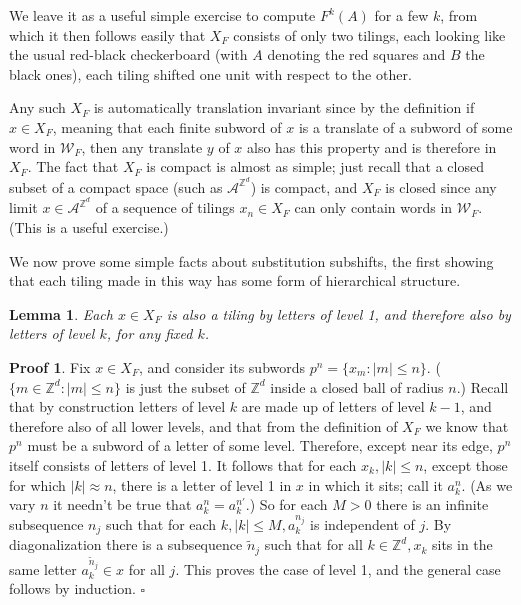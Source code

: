 \documentclass[reqno]{stml-l}
\theoremstyle{plain}
\newtheorem{lemma}[theorem]{Lemma}
\theoremstyle{definition}
\newtheorem*{proof*}{Proof}
\numberwithin{equation}{chapter}
\begin{document}
We leave it as a useful simple exercise to compute $F^{k}(A)$ for a few $k$, from which it then follows easily that $X_{F}$ consists of only two tilings, each looking like the usual red-black checkerboard (with $A$ denoting the red squares and $B$ the black ones), each tiling shifted one unit with respect to the other.

Any such $X_{F}$ is automatically translation invariant since by the definition if $x\in X_{F}$, meaning that each finite subword of $x$ is a translate of a subword of some word in $\mathcal{W}_{F}$, then any translate $y$ of $x$ also has this property and is therefore in $X_{F}$. The fact that $X_{F}$ is compact is almost as simple; just recall that a closed subset of a compact space (such as $\mathcal{A}^{\mathbb{Z}^{d}}$) is compact, and $X_{F}$ is closed since any limit $x\in \mathcal{A}^{\mathbb{Z}^{d}}$ of a sequence of tilings $x_{n}\in X_{F}$ can only contain words in $\mathcal{W}_{F}$. (This is a useful exercise.)

We now prove some simple facts about substitution subshifts, the first showing that each tiling made in this way has some form of hierarchical structure.

\begin{lemma}\label{ch01:lem1.4}
Each $x\in X_{F}$ is also a tiling by letters of level 1, and therefore also by letters of level $k$, for any fixed $k$.
\end{lemma}

\begin{proof*}
Fix $x\in X_{F}$, and consider its subwords $p^{n}=\{x_{m}:|m|\leq n\}$.
($\{m\in \mathbb{Z}^{d}:|m|\leq n\}$ is just the subset of $\mathbb{Z}^{d}$ inside a closed ball of radius $n$.) Recall that by construction letters of level $k$ are made up of letters of level $k-1$, and therefore also of all lower levels, and that from the definition of $X_{F}$ we know that $p^{n}$ must be a subword of a letter of some level. Therefore, except near its edge, $p^{n}$ itself consists of letters of level 1. It follows that for each $x_{k},|k|\leq n$, except those for which $|k|\approx n$, there is a letter of level 1 in $x$ in which it sits; call it $a_{k}^{n}$. (As we vary $n$ it needn't be true that $a_{k}^{n}=a_{k}^{n'}$.) So for each $M>0$ there is an infinite subsequence $n_{j}$ such that for each $k,|k|\leq M,a_{k}^{n_{j}}$ is independent of $j$. By diagonalization there is a subsequence $\tilde{n}_{j}$ such that for all $k\in \mathbb{Z}^{d},x_{k}$ sits in the same letter $a_{k}^{\tilde{n}_{j}}\in x$ for all $j$. This proves the case of level 1, and the general case follows by induction. \hfill$\square$
\end{proof*}
\end{document}

